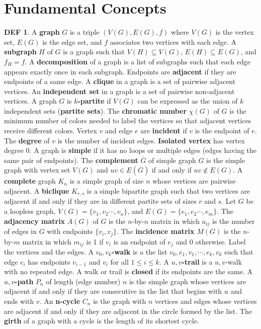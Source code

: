 \documentclass[11pt]{article}
\theoremstyle{definition}
\newtheorem*{defin}{DEF}
\theoremstyle{dotles}
\theoremstyle{dotless}
\theoremstyle{remark}
\begin{document}
\section{Fundamental Concepts}

\begin{defin}
A \textbf{graph} $G$ is a triple $(V(G),E(G),f)$ where $V(G)$ is the vertex set, $E(G)$ is the edge set, and $f$ associates two vertices with each edge. A \textbf{subgraph} $H$ of $G$ is a graph such that $V(H)\subseteq V(G)$, $E(H)\subseteq E(G)$, and $f_H=f$. A \textbf{decomposition} of a graph is a list of subgraphs such that each edge appears exactly once in each subgraph.\medbreak
Endpoints are \textbf{adjacent} if they are endpoints of a same edge. A \textbf{clique} in a graph is a set of pairwise adjacent vertices. An \textbf{independent set} in a graph is a set of pairwise non-adjacent vertices. A graph $G$ is \textbf{$k$-partite} if $V(G)$ can be expressed as the union of $k$ independent sets (\textbf{partite sets}). The \textbf{chromatic number} $\chi(G)$ of $G$ is the minimum number of colors needed to label the vertices so that adjacent vertices receive different colors. Vertex $v$ and edge $e$ are \textbf{incident} if $v$ is the endpoint of $e$. The \textbf{degree} of $v$ is the number of incident edges. \textbf{Isolated vertex} has vertex degree 0.\medbreak
A graph is \textbf{simple} if it has no loops or multiple edges (edges having the same pair of endpoints). The \textbf{complement} $\overline{G}$ of simple graph $G$ is the simple graph with vertex set $V(G)$ and $uv\in E(\overline{G})$ if and only if $uv\not\in E(G)$. A \textbf{complete} graph $K_n$ is a simple graph of size $n$ whose vertices are pairwise adjacent. A \textbf{biclique} $K_{r,s}$ is a simple bipartite graph such that two vertices are adjacent if and only if they are in different partite sets of sizes $r$ and $s$.\medbreak
Let $G$ be a loopless graph, $V(G)=\{v_1,v_2\cdots,v_n\}$, and $E(G)=\{e_1,e_2\cdots,e_m\}$. The \textbf{adjacency matrix} $A(G)$ of $G$ is the $n$-by-$n$ matrix in which $a_{ij}$ is the number of edges in $G$ with endpoints $\{v_i,v_j\}$. The \textbf{incidence matrix} $M(G)$ is the $n$-by-$m$ matrix in which $m_{ij}$ is 1 if $v_i$ is an endpoint of $e_j$ and 0 otherwise.\medbreak
Label the vertices and the edges. A \textbf{$v_0,v_k$-walk} is a the list $v_0,e_1,v_1,\cdots,e_k,v_k$ such that edge $e_i$ has endpoints $v_{i-1}$ and $v_i$ for all $1\leq i\leq k$. A \textbf{$u,v$-trail} is a $u,v$-walk with no repeated edge. A walk or trail is \textbf{closed} if its endpoints are the same. A \textbf{$u,v$-path} $P_n$ of length (edge number) $n$ is the simple graph whose vertices are adjacent if and only if they are consecutive in the list that begins with $u$ and ends with $v$. An \textbf{n-cycle} $C_n$ is the graph with $n$ vertices and edges whose vertices are adjacent if and only if they are adjacent in the circle formed by the list. The \textbf{girth} of a graph with a cycle is the length of its shortest cycle.\medbreak

\end{defin}
\end{document}
